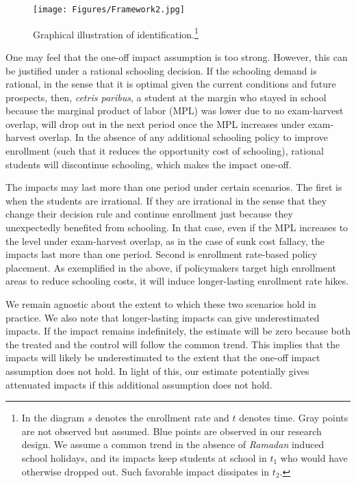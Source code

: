 \documentclass[12pt,letterpaper]{article}
\newcommand{\0}{\ensuremath{\mbox{\boldmath $0$}}}
\begin{document}
\begin{figure}[h!]
\centering
\texttt{[image: Figures/Framework2.jpg]}\\
\caption{Graphical illustration of identification.\footnote{In the diagram $s$ denotes the enrollment rate and $t$ denotes time. Gray points are not observed but assumed. Blue points are observed in our research design. We assume a common trend in the absence of \textit{Ramadan} induced school holidays, and its impacts keep students at school in $t_{1}$ who would have otherwise dropped out. Such favorable impact dissipates in $t_{2}$.}}
\label{ididea}
\end{figure}



One may feel that the one-off impact assumption is too strong. However, this can be justified under a rational schooling decision. If the schooling demand is rational, in the sense that it is optimal given the current conditions and future prospects, then, \textit{cetris paribus}, a student at the margin who stayed in school because the marginal product of labor (MPL) was lower due to no exam-harvest overlap, will drop out in the next period once the MPL increases under exam-harvest overlap. In the absence of any additional schooling policy to improve enrollment (such that it reduces the opportunity cost of schooling), rational students will discontinue schooling, which makes the impact one-off. 

The impacts may last more than one period under certain scenarios. The first is when the students are irrational. If they are irrational in the sense that they change their decision rule and continue enrollment just because they unexpectedly benefited from schooling. In that case, even if the MPL increases to the level under exam-harvest overlap, as in the case of sunk cost fallacy, the impacts last more than one period. Second is enrollment rate-based policy placement. As exemplified in the above, if policymakers target high enrollment areas to reduce schooling costs, it will induce longer-lasting enrollment rate hikes. 

We remain agnostic about the extent to which these two scenarios hold in practice. We also note that longer-lasting impacts can give underestimated impacts. If the impact remains indefinitely, the estimate will be zero because both the treated and the control will follow the common trend. This implies that the impacts will likely be underestimated to the extent that the one-off impact assumption does not hold. In light of this, our estimate potentially gives attenuated impacts if this additional assumption does not hold.
\end{document}
